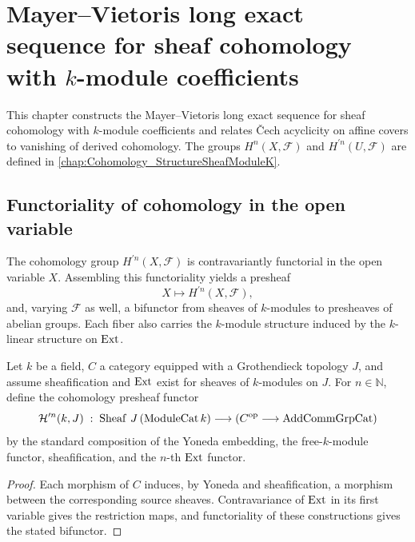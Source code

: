 \chapter{Mayer--Vietoris long exact sequence for sheaf cohomology with \(k\)-module coefficients}
\label{chap:Cohomology_MayerVietoris}

This chapter constructs the Mayer--Vietoris long exact sequence for sheaf cohomology with \(k\)-module coefficients and relates \v{C}ech acyclicity on affine covers to vanishing of derived cohomology. The groups \(H^n(X,\mathcal F)\) and \(H^{\prime n}(U,\mathcal F)\) are defined in \cref{chap:Cohomology_StructureSheafModuleK}.

\section{Functoriality of cohomology in the open variable}
\label{sec:hmodule_prime_cohomologyPresheaf}

The cohomology group \(H^{\prime n}(X,\mathcal F)\) is contravariantly functorial in the open variable \(X\). Assembling this functoriality yields a presheaf
\[
  X \longmapsto H^{\prime n}(X, \mathcal F),
\]
and, varying \(\mathcal F\) as well, a bifunctor from sheaves of \(k\)-modules to presheaves of abelian groups. Each fiber also carries the \(k\)-module structure induced by the \(k\)-linear structure on \(\operatorname{Ext}\).

\begin{definition}\leanok
  \label{def:Scheme_HModule_prime_cohomologyPresheafFunctor}

  Let \(k\) be a field, \(C\) a category equipped with a Grothendieck topology \(J\), and assume sheafification and \(\operatorname{Ext}\) exist for sheaves of \(k\)-modules on \(J\). For \(n \in \mathbb N\), define the cohomology presheaf functor
  \[
    \mathcal H^{\prime n}(k, J) \;:\; \operatorname{Sheaf}\,J\,(\mathrm{ModuleCat}\,k) \longrightarrow (C^{\mathrm{op}} \longrightarrow \mathrm{AddCommGrpCat})
  \]
  by the standard composition of the Yoneda embedding, the free-\(k\)-module functor, sheafification, and the \(n\)-th \(\operatorname{Ext}\) functor.
\end{definition}

\begin{proof}
  
  \leanok
  Each morphism of \(C\) induces, by Yoneda and sheafification, a morphism between the corresponding source sheaves. Contravariance of \(\operatorname{Ext}\) in its first variable gives the restriction maps, and functoriality of these constructions gives the stated bifunctor.
\end{proof}

